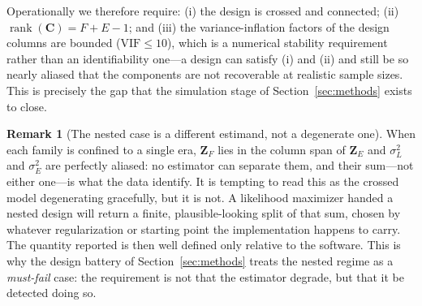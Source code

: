 \documentclass{ieeeaccess}
\theoremstyle{definition}
\newtheorem{remark}{Remark}
\theoremstyle{plain}
\begin{document}
Operationally we therefore require: (i) the design is crossed and connected;
(ii) $\operatorname{rank}(\mathbf{C}) = F+E-1$; and (iii) the
variance-inflation factors of the design columns are bounded
($\mathrm{VIF}\le10$), which is a numerical stability requirement rather than an
identifiability one---a design can satisfy (i) and (ii) and still be so nearly
aliased that the components are not recoverable at realistic sample sizes. This
is precisely the gap that the simulation stage of Section~\ref{sec:methods}
exists to close.

\begin{remark}[The nested case is a different estimand, not a degenerate one]
\label{rem:nested}
When each family is confined to a single era, $\mathbf{Z}_{F}$ lies in the
column span of $\mathbf{Z}_{E}$ and $\sigma^{2}_{L}$ and $\sigma^{2}_{E}$ are
perfectly aliased: no estimator can separate them, and their sum---not either
one---is what the data identify. It is tempting to read this as the crossed
model degenerating gracefully, but it is not. A likelihood maximizer handed a
nested design will return a finite, plausible-looking split of that sum, chosen
by whatever regularization or starting point the implementation happens to
carry. The quantity reported is then well defined only relative to the
software. This is why the design battery of Section~\ref{sec:methods} treats
the nested regime as a \emph{must-fail} case: the requirement is not that the
estimator degrade, but that it be detected doing so.
\end{remark}
\end{document}
